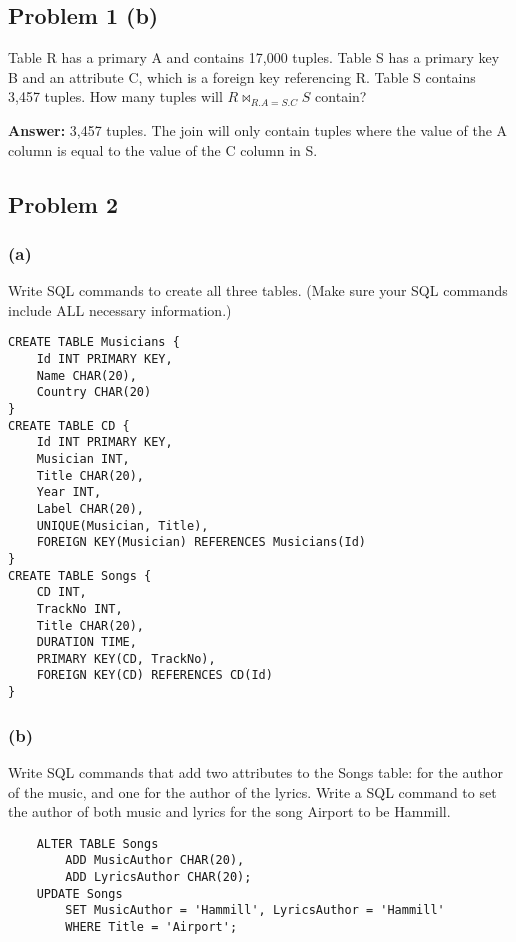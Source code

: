 \documentclass{article}
\begin{document}
\subsection*{Problem 1 (b)}
Table R has a primary A and contains 17,000 tuples. Table S has a primary key
B and an attribute C, which is a foreign key referencing R. Table S contains 
3,457 tuples. How many tuples will $R\bowtie_{R.A=S.C}S$ contain? \newline

\textbf{Answer:} 3,457 tuples. The join will only contain tuples where the
value of the A column is equal to the value of the C column in S.

\subsection*{Problem 2}
\subsubsection*{(a)}
Write SQL commands to create all three tables. (Make sure your SQL commands
include ALL necessary information.)

\begin{verbatim}
CREATE TABLE Musicians {
    Id INT PRIMARY KEY,
    Name CHAR(20),
    Country CHAR(20)
}
CREATE TABLE CD {
    Id INT PRIMARY KEY,
    Musician INT,
    Title CHAR(20),
    Year INT,
    Label CHAR(20),
    UNIQUE(Musician, Title),
    FOREIGN KEY(Musician) REFERENCES Musicians(Id)
}
CREATE TABLE Songs {
    CD INT,
    TrackNo INT,
    Title CHAR(20),
    DURATION TIME,
    PRIMARY KEY(CD, TrackNo),
    FOREIGN KEY(CD) REFERENCES CD(Id)
}
\end{verbatim}

\subsubsection*{(b)}
Write SQL commands that add two attributes to the Songs table: for the author 
of the music, and one for the author of the lyrics. Write a SQL command to set
the author of both music and lyrics for the song Airport to be Hammill. \newline

\begin{verbatim}
    ALTER TABLE Songs
        ADD MusicAuthor CHAR(20),
        ADD LyricsAuthor CHAR(20);
    UPDATE Songs
        SET MusicAuthor = 'Hammill', LyricsAuthor = 'Hammill'
        WHERE Title = 'Airport';
\end{verbatim}
\end{document}
